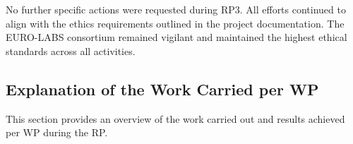 No further specific actions were requested during RP3. 
 All efforts continued to align with the ethics requirements outlined in the project documentation. The EURO-LABS consortium remained vigilant and  maintained the highest ethical standards across all activities.


\subsection{Explanation of the Work Carried per WP}

This section provides an overview of the work carried out and results achieved per WP 
during the  \acrshort{RP}.   







% 










